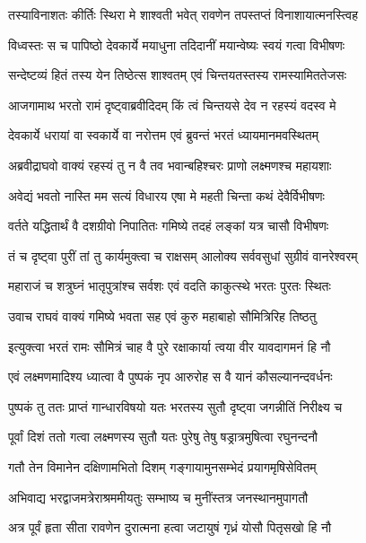 \twolineshloka
{तस्याविनाशतः कीर्तिः स्थिरा मे शाश्वती भवेत्}
{रावणेन तपस्तप्तं विनाशायात्मनस्त्विह}%

\twolineshloka
{विध्वस्तः स च पापिष्ठो देवकार्ये मयाधुना}
{तदिदानीं मयान्वेष्यः स्वयं गत्वा विभीषणः}%

\twolineshloka
{सन्देष्टव्यं हितं तस्य येन तिष्ठेत्स शाश्वतम्}
{एवं चिन्तयतस्तस्य रामस्यामिततेजसः}%

\twolineshloka
{आजगामाथ भरतो रामं दृष्ट्वाब्रवीदिदम्}
{किं त्वं चिन्तयसे देव न रहस्यं वदस्व मे}%

\twolineshloka
{देवकार्ये धरायां वा स्वकार्ये वा नरोत्तम}
{एवं ब्रुवन्तं भरतं ध्यायमानमवस्थितम्}%

\twolineshloka
{अब्रवीद्राघवो वाक्यं रहस्यं तु न वै तव}
{भवान्बहिश्चरः प्राणो लक्ष्मणश्च महायशाः}%

\twolineshloka
{अवेद्यं भवतो नास्ति मम सत्यं विधारय}
{एषा मे महती चिन्ता कथं देवैर्विभीषणः}%

\twolineshloka
{वर्तते यद्धितार्थं वै दशग्रीवो निपातितः}
{गमिष्ये तदहं लङ्कां यत्र चासौ विभीषणः}%

\twolineshloka
{तं च दृष्ट्वा पुरीं तां तु कार्यमुक्त्वा च राक्षसम्}
{आलोक्य सर्ववसुधां सुग्रीवं वानरेश्वरम्}%

\twolineshloka
{महाराजं च शत्रुघ्नं भातृपुत्रांश्च सर्वशः}
{एवं वदति काकुत्स्थे भरतः पुरतः स्थितः}%

\twolineshloka
{उवाच राघवं वाक्यं गमिष्ये भवता सह}
{एवं कुरु महाबाहो सौमित्रिरिह तिष्ठतु}%

\twolineshloka
{इत्युक्त्वा भरतं रामः सौमित्रं चाह वै पुरे}
{रक्षाकार्या त्वया वीर यावदागमनं हि नौ}%

\twolineshloka
{एवं लक्ष्मणमादिश्य ध्यात्वा वै पुष्पकं नृप}
{आरुरोह स वै यानं कौसल्यानन्दवर्धनः}%

\twolineshloka
{पुष्पकं तु ततः प्राप्तं गान्धारविषयो यतः}
{भरतस्य सुतौ दृष्ट्वा जगन्नीतिं निरीक्ष्य च}%

\twolineshloka
{पूर्वां दिशं ततो गत्वा लक्ष्मणस्य सुतौ यतः}
{पुरेषु तेषु षड्रात्रमुषित्वा रघुनन्दनौ}%

\twolineshloka
{गतौ तेन विमानेन दक्षिणामभितो दिशम्}
{गङ्गायामुनसम्भेदं प्रयागमृषिसेवितम्}%

\twolineshloka
{अभिवाद्य भरद्वाजमत्रेराश्रममीयतुः}
{सम्भाष्य च मुनींस्तत्र जनस्थानमुपागतौ}%


\twolineshloka
{अत्र पूर्वं हृता सीता रावणेन दुरात्मना}
{हत्वा जटायुषं गृध्रं योसौ पितृसखो हि नौ}%

